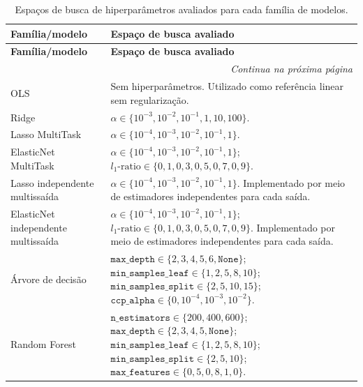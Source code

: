 \begin{longtable}{p{3.8cm} p{9.8cm}}
\caption[Espaços de busca de hiperparâmetros por família de modelos]{Espaços de busca de hiperparâmetros avaliados para cada família de modelos.}
\label{tab:espacos_busca_hiperparametros}\\
\hline
\textbf{Família/modelo} & \textbf{Espaço de busca avaliado} \\
\hline
\endfirsthead

\hline
\textbf{Família/modelo} & \textbf{Espaço de busca avaliado} \\
\hline
\endhead

\hline
\multicolumn{2}{r}{\textit{Continua na próxima página}} \\
\endfoot

\hline
\endlastfoot

OLS
&
Sem hiperparâmetros. Utilizado como referência linear sem regularização. \\

Ridge
&
\(\alpha \in \{10^{-3},10^{-2},10^{-1},1,10,100\}\). \\

Lasso MultiTask
&
\(\alpha \in \{10^{-4},10^{-3},10^{-2},10^{-1},1\}\). \\

ElasticNet MultiTask
&
\(\alpha \in \{10^{-4},10^{-3},10^{-2},10^{-1},1\}\);
\(l_1\text{-ratio} \in \{0{,}1,0{,}3,0{,}5,0{,}7,0{,}9\}\). \\

Lasso independente multissaída
&
\(\alpha \in \{10^{-4},10^{-3},10^{-2},10^{-1},1\}\). Implementado por meio de estimadores independentes para cada saída. \\

ElasticNet independente multissaída
&
\(\alpha \in \{10^{-4},10^{-3},10^{-2},10^{-1},1\}\);
\(l_1\text{-ratio} \in \{0{,}1,0{,}3,0{,}5,0{,}7,0{,}9\}\). Implementado por meio de estimadores independentes para cada saída. \\

Árvore de decisão
&
\(\texttt{max\_depth} \in \{2,3,4,5,6,\texttt{None}\}\);
\(\texttt{min\_samples\_leaf} \in \{1,2,5,8,10\}\);
\(\texttt{min\_samples\_split} \in \{2,5,10,15\}\);
\(\texttt{ccp\_alpha} \in \{0,10^{-4},10^{-3},10^{-2}\}\). \\

Random Forest
&
\(\texttt{n\_estimators} \in \{200,400,600\}\);
\(\texttt{max\_depth} \in \{2,3,4,5,\texttt{None}\}\);
\(\texttt{min\_samples\_leaf} \in \{1,2,5,8,10\}\);
\(\texttt{min\_samples\_split} \in \{2,5,10\}\);
\(\texttt{max\_features} \in \{0{,}5,0{,}8,1{,}0\}\). \\


\end{longtable}
